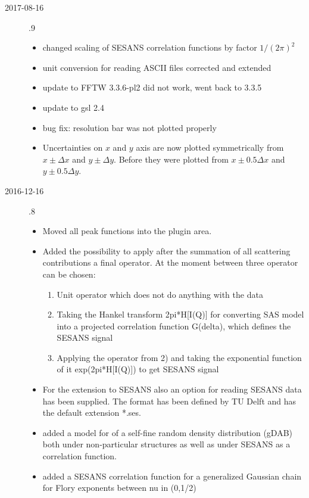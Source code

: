 \begin{description}
\begin{itemize}
    \end{itemize}
\item[2017-08-16] .9
    \begin{itemize}
    \item changed scaling of SESANS correlation functions by factor $1/(2\pi)^2$
    \item unit conversion for reading ASCII files corrected and extended
    \item update to FFTW 3.3.6-pl2 did not work, went back to 3.3.5
    \item update to gsl 2.4
    \item bug fix: resolution bar was not plotted properly
    \item Uncertainties on $x$ and $y$ axis are now plotted symmetrically from $x\pm\Delta x$ and $y\pm\Delta y$.
          Before they were plotted from $x\pm0.5\Delta x$ and $y\pm0.5\Delta y$.
    \end{itemize}
\item[2016-12-16] .8
    \begin{itemize}
        \item Moved all peak functions into the plugin area.
        \item Added the possibility to apply after the summation of all scattering contributions a final operator.  At the moment between three operator can be chosen:
        \begin{enumerate}
            \item Unit operator which does not do anything with the data
            \item Taking the Hankel transform 2pi*H[I(Q)] for converting SAS model into a projected correlation function G(delta), which defines the SESANS signal
            \item Applying the operator from 2) and taking the exponential function of it exp(2pi*H[I(Q)]) to get SESANS signal
        \end{enumerate}
        \item For the extension to SESANS also an option for reading SESANS data has been supplied. The format has been defined by TU Delft and has the default extension *.ses.
        \item added a model for of a self-fine random density distribution (gDAB) both under non-particular  structures as well as under SESANS as a correlation function.
        \item added a SESANS correlation function for a generalized Gaussian chain for Flory exponents between nu in (0,1/2)

\end{itemize}
\end{description}
